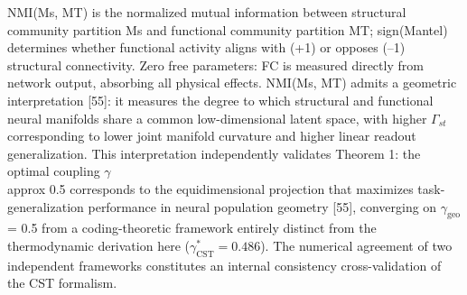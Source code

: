 \documentclass[a4paper,12pt]{article}
\begin{document}
NMI(Ms, MT) is the normalized mutual information between structural community partition Ms and functional community partition MT; sign(Mantel) determines whether functional activity aligns with (+1) or opposes (--1) structural connectivity. Zero free parameters: FC is measured directly from network output, absorbing all physical effects. NMI(Ms, MT) admits a geometric interpretation [55]: it measures the degree to which structural and functional neural manifolds share a common low-dimensional latent space, with higher $\Gamma_{st}$ corresponding to lower joint manifold curvature and higher linear readout generalization. This interpretation independently validates Theorem 1: the optimal coupling $\gamma$  \\approx  0.5 corresponds to the equidimensional projection that maximizes task-generalization performance in neural population geometry [55], converging on $\gamma_{\text{geo}}$ = 0.5 from a coding-theoretic framework entirely distinct from the thermodynamic derivation here ($\gamma^*_{\text{CST}} = 0.486$). The numerical agreement of two independent frameworks constitutes an internal consistency cross-validation of the CST formalism.
\end{document}
